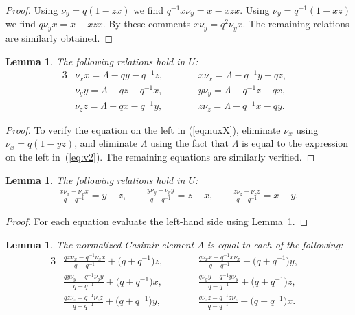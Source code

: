 \documentclass[pdftex]{sigma}
\numberwithin{equation}{section}
\newtheorem{Lemma}[Theorem]{Lemma}
\begin{document}
\begin{proof}
Using $\nu_y = q(1-zx)$ we f\/ind
$q^{-1}x \nu_y=x-xzx$.
Using $\nu_y= q^{-1}(1-xz)$ we f\/ind
$q\nu_y x = x - xzx$. By these comments
$x \nu_y = q^2 \nu_y x$. The remaining
relations are similarly obtained.
\end{proof}

\begin{Lemma}
\label{lem:xvx}
The following relations hold in
$U$:
\begin{alignat}{3}
& \nu_x x = \Lambda - q y - q^{-1}z,
\qquad &&
x\nu_x = \Lambda - q^{-1}y - qz, &
\label{eq:nuxX}
\\
& \nu_y y = \Lambda - q z - q^{-1}x,
\qquad &&
y\nu_y = \Lambda - q^{-1}z - qx,&
\label{eq:nuyY}
\\
& \nu_z z = \Lambda - q x - q^{-1}y,
\qquad &&
z\nu_z = \Lambda - q^{-1}x - qy.&
\label{eq:nuzZ}
\end{alignat}
\end{Lemma}

\begin{proof}
To
verify the equation on
the left in
(\ref{eq:nuxX}), eliminate
$\nu_x$ using $\nu_x = q(1-yz)$, and eliminate
$\Lambda$
using the fact that $\Lambda$ is equal to
the expression on the left in~(\ref{eq:v2}).
 The remaining equations are
similarly verif\/ied.
\end{proof}


\begin{Lemma}
\label{lem:xnxcom}
The following relations hold in
$U$:
\begin{gather*}
\frac{x\nu_x-\nu_x x}{q-q^{-1}}  =  y-z,
\qquad
\frac{y\nu_y-\nu_y y}{q-q^{-1}}  =  z-x,
\qquad
\frac{z\nu_z-\nu_z z}{q-q^{-1}}  =  x-y.
\end{gather*}
\end{Lemma}

\begin{proof}
For each equation evaluate the left-hand side
using
Lemma~\ref{lem:xvx}.
\end{proof}




\begin{Lemma}
The normalized Casimir element $\Lambda$ is equal
to each of the following:
\begin{alignat}{3}
&\frac{qx \nu_x - q^{-1}\nu_x x}{q-q^{-1}}+\big(q+q^{-1}\big)z,
\qquad &&
\frac{q \nu_x x - q^{-1}x\nu_x}{q-q^{-1}}+\big(q+q^{-1}\big)y,&
\label{eq:dcas1}
\\
&\frac{qy \nu_y - q^{-1}\nu_y y}{q-q^{-1}}+\big(q+q^{-1}\big)x,
\qquad &&
\frac{q \nu_y y - q^{-1}y\nu_y}{q-q^{-1}}+\big(q+q^{-1}\big)z, &
\label{eq:dcas2}
\\
& \frac{qz \nu_z - q^{-1}\nu_z z}{q-q^{-1}}+\big(q+q^{-1}\big)y,
\qquad &&
\frac{q \nu_z z - q^{-1}z\nu_z}{q-q^{-1}}+\big(q+q^{-1}\big)x.&
\label{eq:dcas3}
\end{alignat}
\end{Lemma}
\end{document}
